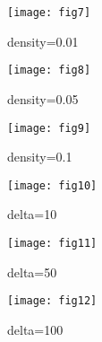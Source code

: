 \begin{figure}
\texttt{[image: fig7]}
\caption{density=0.01}\label{fig:mf1}
\end{figure}
\begin{figure}
\texttt{[image: fig8]}
\caption{density=0.05}\label{fig:mf2}
\end{figure}
\begin{figure}
\texttt{[image: fig9]}
\caption{density=0.1}\label{fig:mf3}
\end{figure}
\begin{figure}
\texttt{[image: fig10]}
\caption{delta=10}\label{fig:mf4}
\end{figure}
\begin{figure}
\texttt{[image: fig11]}
\caption{delta=50}\label{fig:mf5}
\end{figure}
\begin{figure}
\texttt{[image: fig12]}
\caption{delta=100}\label{fig:mf6}
\end{figure}
